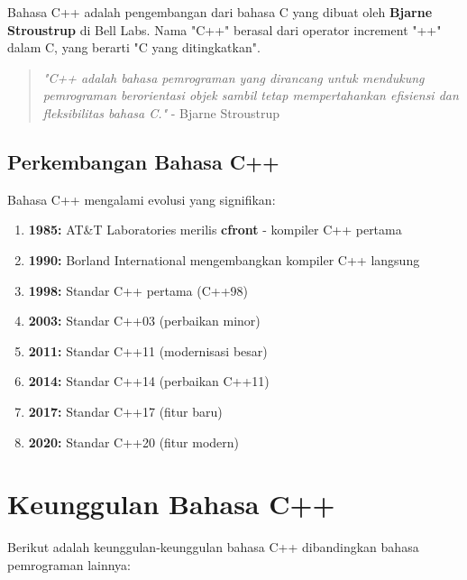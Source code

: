 Bahasa C++ adalah pengembangan dari bahasa C yang dibuat oleh \textbf{Bjarne Stroustrup} di Bell Labs. Nama "C++" berasal dari operator increment "++" dalam C, yang berarti "C yang ditingkatkan".

\begin{quote}
\textit{"C++ adalah bahasa pemrograman yang dirancang untuk mendukung pemrograman berorientasi objek sambil tetap mempertahankan efisiensi dan fleksibilitas bahasa C."} - Bjarne Stroustrup
\end{quote}

\subsection{Perkembangan Bahasa C++}

Bahasa C++ mengalami evolusi yang signifikan:

\begin{enumerate}
\item \textbf{1985:} AT\&T Laboratories merilis \textbf{cfront} - kompiler C++ pertama
\item \textbf{1990:} Borland International mengembangkan kompiler C++ langsung
\item \textbf{1998:} Standar C++ pertama (C++98)
\item \textbf{2003:} Standar C++03 (perbaikan minor)
\item \textbf{2011:} Standar C++11 (modernisasi besar)
\item \textbf{2014:} Standar C++14 (perbaikan C++11)
\item \textbf{2017:} Standar C++17 (fitur baru)
\item \textbf{2020:} Standar C++20 (fitur modern)
\end{enumerate}

\section{Keunggulan Bahasa C++}

Berikut adalah keunggulan-keunggulan bahasa C++ dibandingkan bahasa pemrograman lainnya:

